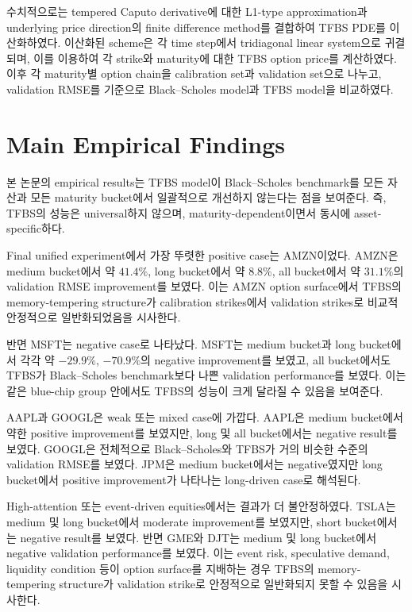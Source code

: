 \documentclass[11pt,a4paper]{report}
\begin{document}
수치적으로는 tempered Caputo derivative에 대한 L1-type approximation과 underlying price direction의 finite difference method를 결합하여 TFBS PDE를 이산화하였다. 이산화된 scheme은 각 time step에서 tridiagonal linear system으로 귀결되며, 이를 이용하여 각 strike와 maturity에 대한 TFBS option price를 계산하였다. 이후 각 maturity별 option chain을 calibration set과 validation set으로 나누고, validation RMSE를 기준으로 Black--Scholes model과 TFBS model을 비교하였다.

\section{Main Empirical Findings}

본 논문의 empirical results는 TFBS model이 Black--Scholes benchmark를 모든 자산과 모든 maturity bucket에서 일괄적으로 개선하지 않는다는 점을 보여준다. 즉, TFBS의 성능은 universal하지 않으며, maturity-dependent이면서 동시에 asset-specific하다.

Final unified experiment에서 가장 뚜렷한 positive case는 AMZN이었다. AMZN은 medium bucket에서 약 \(41.4\%\), long bucket에서 약 \(8.8\%\), all bucket에서 약 \(31.1\%\)의 validation RMSE improvement를 보였다. 이는 AMZN option surface에서 TFBS의 memory-tempering structure가 calibration strikes에서 validation strikes로 비교적 안정적으로 일반화되었음을 시사한다.

반면 MSFT는 negative case로 나타났다. MSFT는 medium bucket과 long bucket에서 각각 약 \(-29.9\%\), \(-70.9\%\)의 negative improvement를 보였고, all bucket에서도 TFBS가 Black--Scholes benchmark보다 나쁜 validation performance를 보였다. 이는 같은 blue-chip group 안에서도 TFBS의 성능이 크게 달라질 수 있음을 보여준다.

AAPL과 GOOGL은 weak 또는 mixed case에 가깝다. AAPL은 medium bucket에서 약한 positive improvement를 보였지만, long 및 all bucket에서는 negative result를 보였다. GOOGL은 전체적으로 Black--Scholes와 TFBS가 거의 비슷한 수준의 validation RMSE를 보였다. JPM은 medium bucket에서는 negative였지만 long bucket에서 positive improvement가 나타나는 long-driven case로 해석된다.

High-attention 또는 event-driven equities에서는 결과가 더 불안정하였다. TSLA는 medium 및 long bucket에서 moderate improvement를 보였지만, short bucket에서는 negative result를 보였다. 반면 GME와 DJT는 medium 및 long bucket에서 negative validation performance를 보였다. 이는 event risk, speculative demand, liquidity condition 등이 option surface를 지배하는 경우 TFBS의 memory-tempering structure가 validation strike로 안정적으로 일반화되지 못할 수 있음을 시사한다.
\end{document}
